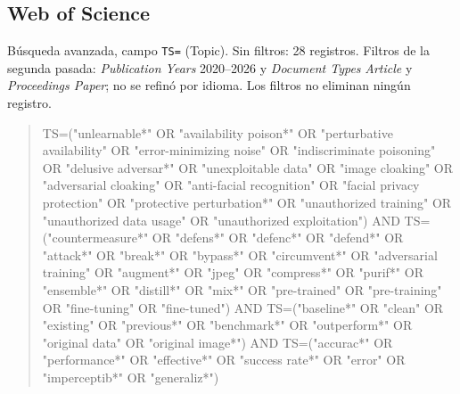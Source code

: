 \documentclass[pdflatex,sn-mathphys-num]{sn-jnl}
\theoremstyle{thmstyleone}
\theoremstyle{thmstyletwo}
\theoremstyle{thmstylethree}
\begin{document}
\begin{appendices}
\subsection{Web of Science}
Búsqueda avanzada, campo \texttt{TS=} (Topic). Sin filtros: 28 registros. Filtros de la segunda pasada: \emph{Publication Years} 2020--2026 y \emph{Document Types} \emph{Article} y \emph{Proceedings Paper}; no se refinó por idioma. Los filtros no eliminan ningún registro.
\begin{quote}\footnotesize\ttfamily\raggedright
TS=("unlearnable*" OR \allowbreak "availability poison*" OR \allowbreak "perturbative availability" OR \allowbreak "error-minimizing noise" OR \allowbreak "indiscriminate poisoning" OR \allowbreak "delusive adversar*" OR \allowbreak "unexploitable data" OR \allowbreak "image cloaking" OR \allowbreak "adversarial cloaking" OR \allowbreak "anti-facial recognition" OR \allowbreak "facial privacy protection" OR \allowbreak "protective perturbation*" OR \allowbreak "unauthorized training" OR \allowbreak "unauthorized data usage" OR \allowbreak "unauthorized exploitation") AND \allowbreak TS=("countermeasure*" OR \allowbreak "defens*" OR \allowbreak "defenc*" OR \allowbreak "defend*" OR \allowbreak "attack*" OR \allowbreak "break*" OR \allowbreak "bypass*" OR \allowbreak "circumvent*" OR \allowbreak "adversarial training" OR \allowbreak "augment*" OR \allowbreak "jpeg" OR \allowbreak "compress*" OR \allowbreak "purif*" OR \allowbreak "ensemble*" OR \allowbreak "distill*" OR \allowbreak "mix*" OR \allowbreak "pre-trained" OR \allowbreak "pre-training" OR \allowbreak "fine-tuning" OR \allowbreak "fine-tuned") AND \allowbreak TS=("baseline*" OR \allowbreak "clean" OR \allowbreak "existing" OR \allowbreak "previous*" OR \allowbreak "benchmark*" OR \allowbreak "outperform*" OR \allowbreak "original data" OR \allowbreak "original image*") AND \allowbreak TS=("accurac*" OR \allowbreak "performance*" OR \allowbreak "effective*" OR \allowbreak "success rate*" OR \allowbreak "error" OR \allowbreak "imperceptib*" OR \allowbreak "generaliz*")
\end{quote}

\end{appendices}
\end{document}
